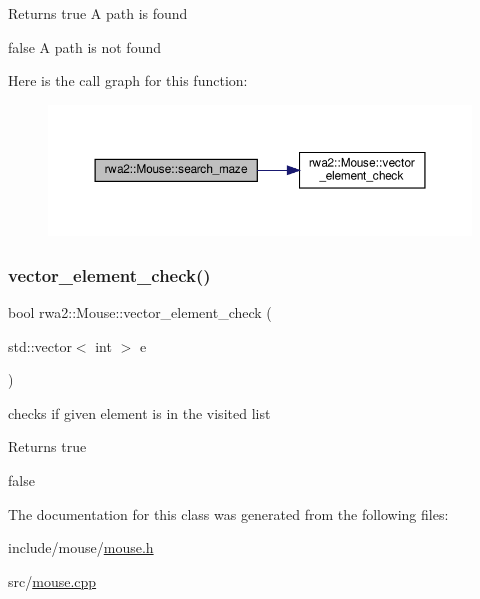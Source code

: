 \begin{DoxyReturn}{Returns}
true A path is found 

false A path is not found 
\end{DoxyReturn}
Here is the call graph for this function\+:
\nopagebreak
\begin{figure}[H]
\begin{center}
\leavevmode
\includegraphics[width=350pt]{classrwa2_1_1_mouse_a4b441e30f6c9d446b901f9b21ba104df_cgraph}
\end{center}
\end{figure}
\mbox{\label{classrwa2_1_1_mouse_a069b6c1433777dd7d2709814aa418463}} 
\subsubsection{\texorpdfstring{vector\+\_\+element\+\_\+check()}{vector\_element\_check()}}
{\footnotesize\ttfamily bool rwa2\+::\+Mouse\+::vector\+\_\+element\+\_\+check (\begin{DoxyParamCaption}\item[{std\+::vector$<$ int $>$}]{e }\end{DoxyParamCaption})}



checks if given element is in the visited list 

\begin{DoxyReturn}{Returns}
true 

false 
\end{DoxyReturn}


The documentation for this class was generated from the following files\+:\begin{DoxyCompactItemize}
\item 
include/mouse/\hyperlink{mouse_8h}{mouse.\+h}\item 
src/\hyperlink{mouse_8cpp}{mouse.\+cpp}\end{DoxyCompactItemize}
